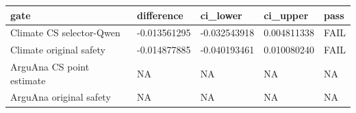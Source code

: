 \begin{tabular}{lllll}
\toprule
gate & difference & ci\_lower & ci\_upper & pass \\
\midrule
Climate CS selector-Qwen & -0.013561295 & -0.032543918 & 0.004811338 & FAIL \\
Climate original safety & -0.014877885 & -0.040193461 & 0.010080240 & FAIL \\
ArguAna CS point estimate & NA & NA & NA & NA \\
ArguAna original safety & NA & NA & NA & NA \\
\bottomrule
\end{tabular}
